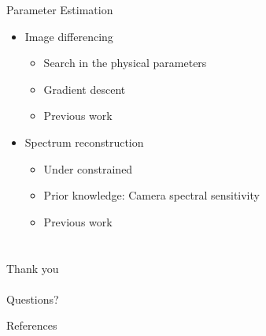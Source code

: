 \documentclass{beamer}
\begin{document}
\begin{frame}{Parameter Estimation}

\begin{itemize}
\setlength\itemsep{0.5em}
\item Image differencing
	\begin{itemize}
	\setlength\itemsep{0.5em}
	\item Search in the physical parameters
	\item Gradient descent
	\item Previous work~\cite{Dobashi:2012}
	\end{itemize}
\item Spectrum reconstruction
	\begin{itemize}
	\setlength\itemsep{0.5em}
	\item Under constrained
	\item Prior knowledge: Camera spectral sensitivity
	\item Previous work~\cite{Smits:1999, Sun2001, Drew:2003}
	\end{itemize}
\end{itemize}

\end{frame}

\section*{}

\begin{frame}[plain,c]

\begin{center}
\huge Thank you
\\~\\
\Large Questions?
\end{center}

\end{frame}


\begin{frame}[allowframebreaks]{References}




\end{frame}

\end{document}
